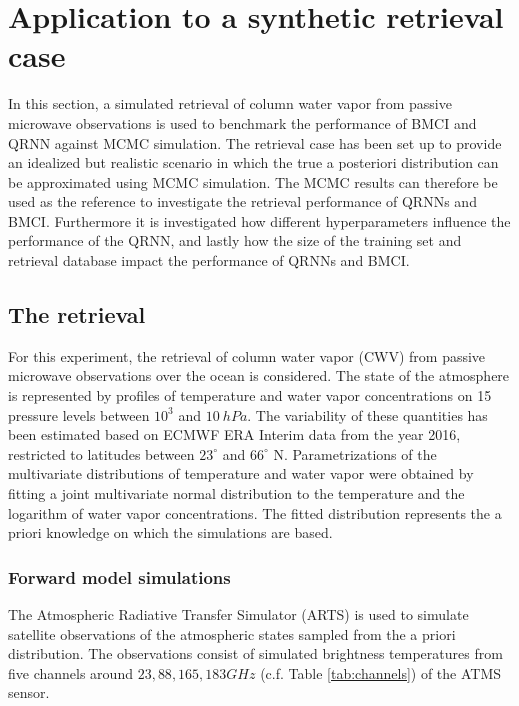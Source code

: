 \documentclass[journal abbreviation, manuscript]{copernicus}
\begin{document}
\section{Application to a synthetic retrieval case}
\label{sec:synthetic}

In this section, a simulated retrieval of column water vapor from passive
microwave observations is used to benchmark the performance of BMCI and QRNN
against MCMC simulation. The retrieval case has been set up to provide an
idealized but realistic scenario in which the true a posteriori distribution can
be approximated using MCMC simulation. The MCMC results can therefore be used as
the reference to investigate the retrieval performance of QRNNs and BMCI. Furthermore
it is investigated how different hyperparameters influence the performance of
the QRNN, and lastly how the size of the training set and retrieval database
impact the performance of QRNNs and BMCI.

\subsection{The retrieval}

   For this experiment, the retrieval of column water vapor (CWV) from passive
   microwave observations over the ocean is considered. The state of the
   atmosphere is represented by profiles of temperature and water vapor
   concentrations on 15 pressure levels between $10^3$ and $10\:\unit{hPa}$. The
   variability of these quantities has been estimated based on ECMWF ERA
   Interim data \citep{era_interim} from the year 2016, restricted to latitudes
   between $23^\circ$ and $66^\circ$ N. Parametrizations of the multivariate
   distributions of temperature and water vapor were obtained by fitting a joint
   multivariate normal distribution to the temperature and the logarithm of
   water vapor concentrations. The fitted distribution represents the a priori
   knowledge on which the simulations are based.

\subsubsection{Forward model simulations}

   The Atmospheric Radiative Transfer Simulator (ARTS) \citep{arts} is used to
   simulate satellite observations of the atmospheric states sampled from the a
   priori distribution. The observations consist of simulated brightness
   temperatures from five channels around $23, 88, 165, 183 \unit{GHz}$
   (c.f. Table \ref{tab:channels}) of the ATMS sensor.
\end{document}

